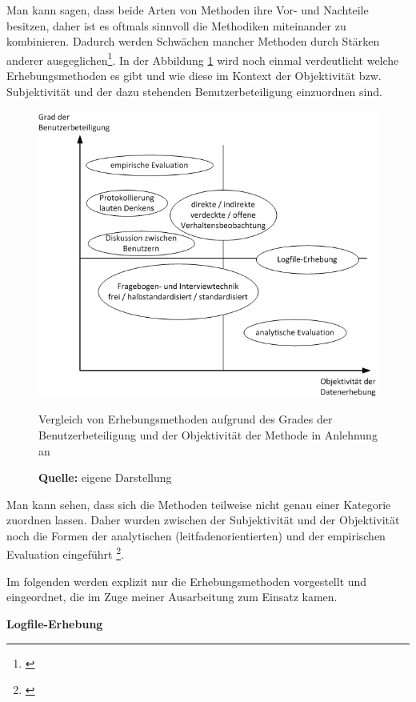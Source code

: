 Man kann sagen, dass beide Arten von Methoden ihre Vor- und Nachteile besitzen, daher ist es oftmals sinnvoll die Methodiken miteinander zu kombinieren. Dadurch werden Schwächen mancher Methoden durch Stärken anderer ausgeglichen\footnote{\cite[vgl.][261]{Pruemper1997}}. In der Abbildung \ref{fig:erhebungsmethodenObjektivitaetBenutzerbeteiligung} wird noch einmal verdeutlicht welche Erhebungsmethoden es gibt und wie diese im Kontext der Objektivität bzw. Subjektivität und der dazu stehenden Benutzerbeteiligung einzuordnen sind.
\begin{figure}[H]
  \centering
  \includegraphics[scale=0.8]{img/Datenerhebungsmethoden_Objektivitaet_Benutzerbeteiligung.png}
  \caption{Vergleich von Erhebungsmethoden aufgrund des Grades der Benutzerbeteiligung und der Objektivität der Methode in Anlehnung an \citep[vgl.][16]{Hegner2003}}
  \caption*{\textbf{Quelle:} eigene Darstellung}
  \label{fig:erhebungsmethodenObjektivitaetBenutzerbeteiligung}
\end{figure}
Man kann sehen, dass sich die Methoden teilweise nicht genau einer Kategorie zuordnen lassen. Daher wurden zwischen der Subjektivität und der Objektivität noch die Formen der analytischen (leitfadenorientierten) und der empirischen Evaluation eingeführt \footnote{\cite[vgl.][15]{Hegner2003}}.

Im folgenden werden explizit nur die Erhebungsmethoden vorgestellt und eingeordnet, die im Zuge meiner Ausarbeitung zum Einsatz kamen.

\textbf{Logfile-Erhebung}


